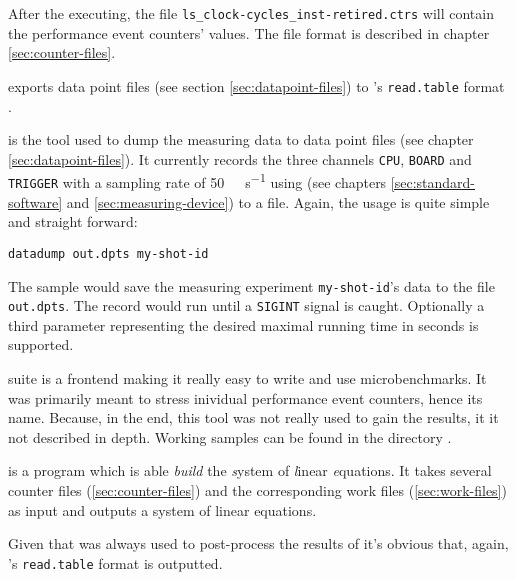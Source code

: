 After the executing, the file \texttt{ls\_clock-cycles\_inst-retired.ctrs} will
contain the performance event counters' values. The file format is described in
chapter \ref{sec:counter-files}.


\JWlfour{\JWTde}

\JWTde{} exports data point files (see section \ref{sec:datapoint-files}) to
\JWTR's \texttt{read.table} format \cite{r11data}.


\JWlfour{\JWTdd}

\JWTdd{} is the tool used to dump the measuring data to data point files (see
chapter \ref{sec:datapoint-files}). It currently records the three channels
\texttt{CPU}, \texttt{BOARD} and \texttt{TRIGGER} with a sampling rate of
\SI{50}{\kilo\samples\per\second} using \JWTnidaqmxbase{} (see chapters
\ref{sec:standard-software} and \ref{sec:measuring-device}) to a file.
Again, the usage is quite simple and straight forward:

\begin{lstlisting}[style=Shell]
datadump out.dpts my-shot-id
\end{lstlisting}

The sample would save the measuring experiment \texttt{my-shot-id}'s data to the
file \texttt{out.dpts}. The record would run until a \texttt{SIGINT} signal is
caught. Optionally a third parameter representing the desired maximal running
time in seconds is supported.



\JWTcbs{} suite is a frontend making it really easy to write and use
microbenchmarks.  It was primarily meant to stress inividual performance event
counters, hence its name. Because, in the end, this tool was not really used to
gain the results, it it not described in depth. Working samples can be found in
the directory .


\JWlfour{\JWTbsle}

\JWTbsle{} is a  program which is able
\emph{build} the \emph{s}ystem of \emph{l}inear \emph{e}quations. It takes
several counter files (\ref{sec:counter-files}) and the corresponding work files
(\ref{sec:work-files}) as input and outputs a system of linear equations.

Given that \JWTR{} was always used to post-process the results of \JWTbsle{}
it's obvious that, again, \JWTR's \texttt{read.table} \cite{r11data} format is
outputted.



